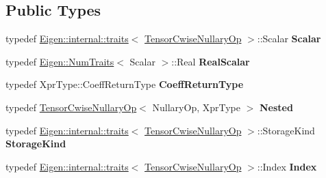 \subsection*{Public Types}
\begin{DoxyCompactItemize}
\item 
\mbox{\label{class_eigen_1_1_tensor_cwise_nullary_op_a413b428db1a77ed81fc72a42a8dd8047}} 
typedef \hyperlink{struct_eigen_1_1internal_1_1traits}{Eigen\+::internal\+::traits}$<$ \hyperlink{class_eigen_1_1_tensor_cwise_nullary_op}{Tensor\+Cwise\+Nullary\+Op} $>$\+::Scalar {\bfseries Scalar}
\item 
\mbox{\label{class_eigen_1_1_tensor_cwise_nullary_op_a66de12785cab6bf0c2fb8c8261fe1ec6}} 
typedef \hyperlink{group___core___module_struct_eigen_1_1_num_traits}{Eigen\+::\+Num\+Traits}$<$ Scalar $>$\+::Real {\bfseries Real\+Scalar}
\item 
\mbox{\label{class_eigen_1_1_tensor_cwise_nullary_op_a6c9799f6ef5aa320749f7434b6c7b1e1}} 
typedef Xpr\+Type\+::\+Coeff\+Return\+Type {\bfseries Coeff\+Return\+Type}
\item 
\mbox{\label{class_eigen_1_1_tensor_cwise_nullary_op_a399505693e1a2518183c7a8159cd6156}} 
typedef \hyperlink{class_eigen_1_1_tensor_cwise_nullary_op}{Tensor\+Cwise\+Nullary\+Op}$<$ Nullary\+Op, Xpr\+Type $>$ {\bfseries Nested}
\item 
\mbox{\label{class_eigen_1_1_tensor_cwise_nullary_op_a670e320d18c51f0d943df8309192958d}} 
typedef \hyperlink{struct_eigen_1_1internal_1_1traits}{Eigen\+::internal\+::traits}$<$ \hyperlink{class_eigen_1_1_tensor_cwise_nullary_op}{Tensor\+Cwise\+Nullary\+Op} $>$\+::Storage\+Kind {\bfseries Storage\+Kind}
\item 
\mbox{\label{class_eigen_1_1_tensor_cwise_nullary_op_a970d73110f02d1ccbf02eee3607ef639}} 
typedef \hyperlink{struct_eigen_1_1internal_1_1traits}{Eigen\+::internal\+::traits}$<$ \hyperlink{class_eigen_1_1_tensor_cwise_nullary_op}{Tensor\+Cwise\+Nullary\+Op} $>$\+::Index {\bfseries Index}
\item 

\end{DoxyCompactItemize}
